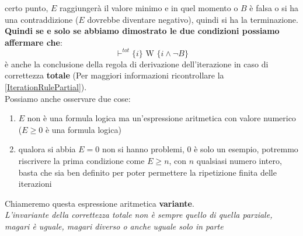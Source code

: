 				      				certo punto, $E$ raggiungerà il valore minimo e in quel momento o $B$ è falsa o
				      				si ha una contraddizione ($E$ dovrebbe diventare negativo), quindi si ha la
				      				terminazione. \\
				      				\textbf{Quindi se e solo se abbiamo dimostrato le due condizioni possiamo affermare che}:
				      				\[\vdash^{tot}\{i\}\mbox{ W }\{i\land\neg B\}\]
				      				è anche la conclusione della regola di derivazione dell'iterazione in caso
				      				di correttezza \textbf{totale} (Per maggiori informazioni ricontrollare la \ref{IterationRulePartial}).\\
				      				Possiamo anche osservare due cose:
				      				\begin{enumerate}
				      					\item $E$ non è una formula logica ma un'espressione aritmetica con valore
				      					      numerico ($E\geq 0$ è una formula logica)
				      					\item qualora si abbia $E=0$ non si hanno problemi, $0$ è solo un esempio,
				      					      potremmo riscrivere la prima condizione come $E\geq n$, con $n$ qualsiasi
				      					      numero intero, basta che sia ben definito per poter permettere la ripetizione
				      					      finita delle iterazioni
				      				\end{enumerate}
				      				Chiameremo questa espressione aritmetica \textbf{variante}.\\
				      				\textit{L'invariante della correttezza totale non è sempre quello di quella
				      				parziale, magari è uguale, magari diverso o anche uguale solo in parte}

